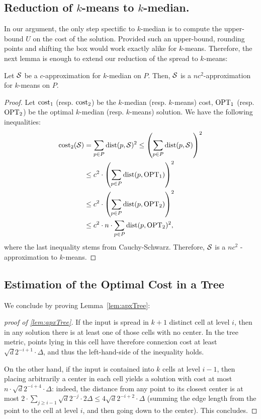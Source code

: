 \subsection{Reduction of $k$-means to $k$-median.}
\label{app:redKM}
In our argument, the only step spectific to $k$-median is to compute the upper-bound $U$ on the cost of the solution. Provided such an upper-bound, rounding points and shifting the box would work exactly alike for $k$-means. Therefore, the next lemma is enough to extend our reduction of the spread to $k$-means:
\begin{lemma}\label{lem:kmedTokmeans}
Let $\mathcal S$ be a $c$-approximation for $k$-median on $P$. Then, $\mathcal S$ is a $nc^2$-approximation for $k$-means on $P$.
\end{lemma}
\begin{proof}
Let $\operatorname{cost}_1$ (resp. $\operatorname{cost}_2$) be the $k$-median (resp. $k$-means) cost, $\text{OPT}_1$ (resp. $\text{OPT}_2$) be the optimal $k$-median (resp. $k$-means) solution. We have the following inequalities:
\begin{align*}
\operatorname{cost}_2(\mathcal S) &= \sum_{p\in P} \operatorname{dist}(p, \mathcal S)^2 \leq \left( \sum_{p\in P} \operatorname{dist}(p, \mathcal S)\right)^2\\
&\leq c^2 \cdot \left(  \sum_{p\in P} \operatorname{dist}(p, \text{OPT}_1)\right)^2\\
&\leq c^2 \cdot \left(  \sum_{p\in P} \operatorname{dist}(p, \text{OPT}_2)\right)^2\\
&\leq c^2 \cdot n \cdot  \sum_{p\in P} \operatorname{dist}(p, \text{OPT}_2)^2,
\end{align*}
where the last inequality stems from Cauchy-Schwarz. Therefore, $\mathcal S$ is a $nc^2$ - approximation to $k$-means. 
\end{proof}

\subsection{Estimation of the Optimal Cost in a Tree}
\label{app:apx-tree-proof}

We conclude by proving Lemma~\ref{lem:apxTree}:
\begin{proof}[proof of \cref{lem:apxTree}]
If the input is spread in $k+1$ distinct cell at level $i$, then in any solution there is at least one of those cells with no center. In the tree metric, points
lying in this cell have therefore connexion cost at least $\sqrt{d}2^{-i+1} \cdot \Delta$, and thus the left-hand-side of the inequality holds.

On the other hand, if the input is contained into $k$ cells at level $i-1$, then placing arbitrarily a center in each cell yields a solution with cost at most
$n \cdot \sqrt{d}2^{-i+4} \cdot \Delta$: indeed, the distance from any point to its closest center is at most $2 \cdot \sum_{j \geq i-1} \sqrt{d}2^{-j} \cdot
2\Delta \leq 4 \sqrt{d}2^{-i+2} \cdot \Delta$ (summing the edge length from the point to the cell at level $i$, and then going down to the center). This
concludes.
\end{proof}


